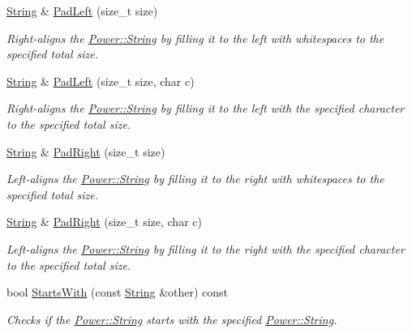 \begin{DoxyCompactItemize}
\hyperlink{class_power_1_1_string}{String} \& \hyperlink{class_power_1_1_string_a724a2049b4f2694049f37ce63f254c94}{Pad\+Left} (size\+\_\+t size)
\begin{DoxyCompactList}\small\item\em Right-\/aligns the \hyperlink{class_power_1_1_string}{Power\+::\+String} by filling it to the left with whitespaces to the specified total size. \end{DoxyCompactList}\item 
\hyperlink{class_power_1_1_string}{String} \& \hyperlink{class_power_1_1_string_a7aace8f1a3e6daa76dcf38f0fdc6947d}{Pad\+Left} (size\+\_\+t size, char c)
\begin{DoxyCompactList}\small\item\em Right-\/aligns the \hyperlink{class_power_1_1_string}{Power\+::\+String} by filling it to the left with the specified character to the specified total size. \end{DoxyCompactList}\item 
\hyperlink{class_power_1_1_string}{String} \& \hyperlink{class_power_1_1_string_a72f14fdd9da7fb797282d55047b82a80}{Pad\+Right} (size\+\_\+t size)
\begin{DoxyCompactList}\small\item\em Left-\/aligns the \hyperlink{class_power_1_1_string}{Power\+::\+String} by filling it to the right with whitespaces to the specified total size. \end{DoxyCompactList}\item 
\hyperlink{class_power_1_1_string}{String} \& \hyperlink{class_power_1_1_string_a4d516bc9b180743b1c0c2bc028c8350b}{Pad\+Right} (size\+\_\+t size, char c)
\begin{DoxyCompactList}\small\item\em Left-\/aligns the \hyperlink{class_power_1_1_string}{Power\+::\+String} by filling it to the right with the specified character to the specified total size. \end{DoxyCompactList}\item 
bool \hyperlink{class_power_1_1_string_ab4836da082c63ddf9f781eb80a10e5d1}{Starts\+With} (const \hyperlink{class_power_1_1_string}{String} \&other) const
\begin{DoxyCompactList}\small\item\em Checks if the \hyperlink{class_power_1_1_string}{Power\+::\+String} starts with the specified \hyperlink{class_power_1_1_string}{Power\+::\+String}. \end{DoxyCompactList}\item 

\end{DoxyCompactItemize}
